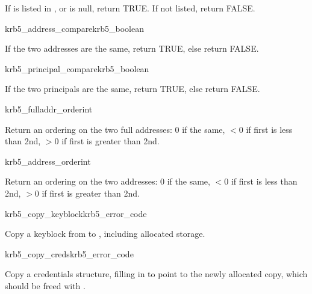 If  is listed in , or
 is null, return TRUE.  If not listed, return FALSE.

\begin{funcdecl}{krb5_address_compare}{krb5_boolean}{\funcin}
\end{funcdecl}

If the two addresses are the same, return TRUE, else return FALSE.

\begin{funcdecl}{krb5_principal_compare}{krb5_boolean}{\funcin}
\end{funcdecl}

If the two principals are the same, return TRUE, else return FALSE.

\begin{funcdecl}{krb5_fulladdr_order}{int}{\funcin}
\end{funcdecl}

Return an ordering on the two full addresses:  0 if the same,
$< 0$ if first is less than 2nd, $> 0$ if first is greater than 2nd.

\begin{funcdecl}{krb5_address_order}{int}{\funcin}
\end{funcdecl}

Return an ordering on the two addresses:  0 if the same,
$< 0$ if first is less than 2nd, $> 0$ if first is greater than 2nd.

\begin{funcdecl}{krb5_copy_keyblock}{krb5_error_code}{\funcin}
\funcout
{}
\end{funcdecl}

Copy a keyblock from  to , including
allocated storage.

\begin{funcdecl}{krb5_copy_creds}{krb5_error_code}{\funcin}
\funcout
{}
\end{funcdecl}

Copy a credentials structure, filling in  to point
to the newly allocated copy, which should be freed with
.

